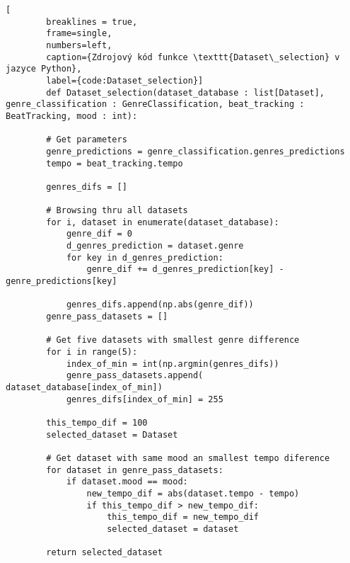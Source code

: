\begin{minipage}{\linewidth}
	\begin{lstlisting}[
		breaklines = true,
		frame=single,
		numbers=left,
		caption={Zdrojový kód funkce \texttt{Dataset\_selection} v jazyce Python},
		label={code:Dataset_selection}]
		def Dataset_selection(dataset_database : list[Dataset], genre_classification : GenreClassification, beat_tracking : BeatTracking, mood : int):

		# Get parameters 
		genre_predictions = genre_classification.genres_predictions
		tempo = beat_tracking.tempo
	
		genres_difs = []
	
		# Browsing thru all datasets
		for i, dataset in enumerate(dataset_database):
			genre_dif = 0
			d_genres_prediction = dataset.genre
			for key in d_genres_prediction:
				genre_dif += d_genres_prediction[key] - genre_predictions[key]
	
			genres_difs.append(np.abs(genre_dif))
		genre_pass_datasets = []
	
		# Get five datasets with smallest genre difference
		for i in range(5):
			index_of_min = int(np.argmin(genres_difs))
			genre_pass_datasets.append( dataset_database[index_of_min])
			genres_difs[index_of_min] = 255
	
		this_tempo_dif = 100
		selected_dataset = Dataset
		
		# Get dataset with same mood an smallest tempo diference
		for dataset in genre_pass_datasets:
			if dataset.mood == mood:
				new_tempo_dif = abs(dataset.tempo - tempo)
				if this_tempo_dif > new_tempo_dif:
					this_tempo_dif = new_tempo_dif
					selected_dataset = dataset
	
		return selected_dataset
	\end{lstlisting}
\end{minipage}





